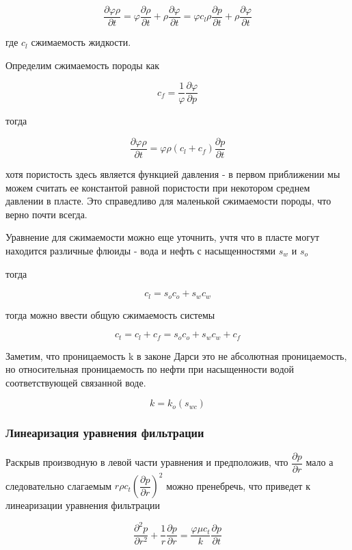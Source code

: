 $$\frac{\partial \varphi \rho}{\partial t} = \varphi \frac{\partial \rho}{\partial t}+ \rho \frac{\partial \varphi }{\partial t} = \varphi c_l \rho \frac{\partial p}{\partial t} + \rho \frac{\partial \varphi }{\partial t}  $$

где $c_l$ сжимаемость жидкости. 

Определим сжимаемость породы как 

$$c_f = \frac{1}{\varphi} \frac{\partial \varphi}{\partial p}$$

тогда 

$$\frac{\partial \varphi \rho}{\partial t}  = \varphi \rho (c_l + c_f) \frac{\partial p}{\partial t}   $$



хотя пористость здесь является функцией давления - в первом приближении мы можем считать ее константой равной пористости при некотором среднем давлении в пласте. Это справедливо для маленькой сжимаемости породы, что верно почти всегда.

Уравнение для сжимаемости можно еще уточнить, учтя что в пласте могут находится различные флюиды - вода и нефть с насыщенностями  $s_w$ и $s_o$

тогда 

$$ c_l = s_o c_o + s_w c_w $$

тогда можно ввести общую сжимаемость системы 

$$ c_t = c_l + c_f = s_o c_o + s_w c_w  + c_f $$ 

Заметим, что проницаемость k в законе Дарси это не абсолютная проницаемость, но относительная проницаемость по нефти при насыщенности водой соответствующей связанной воде.  

$$ k= k_o (s_{wc}) $$

\subsubsection{Линеаризация уравнения фильтрации}

Раскрыв производную в левой части уравнения и предположив, что $\dfrac{\partial p}{\partial r}$ мало а следовательно слагаемым  $ r \rho c_t \left( \dfrac{\partial p}{\partial r} \right)^2 $ можно пренебречь, что приведет к линеаризации уравнения фильтрации

$$ \frac{\partial^2 p}{\partial r^2} + \frac{1}{r} \frac{\partial p}{\partial r}= \frac{\varphi \mu c_t}{k} \frac{\partial p}{\partial t} $$

